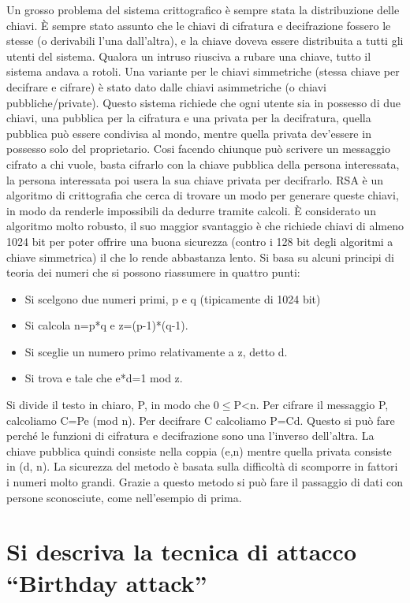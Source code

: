 Un grosso problema del sistema crittografico è sempre stata la distribuzione delle chiavi. 
È sempre stato assunto che le chiavi di cifratura e decifrazione fossero le stesse (o derivabili l’una dall’altra), e la chiave doveva essere distribuita a tutti gli utenti del sistema. Qualora un intruso riusciva a rubare una chiave, tutto il sistema andava a rotoli.
Una variante per le chiavi simmetriche (stessa chiave per decifrare e cifrare) è stato dato dalle chiavi asimmetriche (o chiavi pubbliche/private).
Questo sistema richiede che ogni utente sia in possesso di due chiavi, una pubblica per la cifratura e una privata per la decifratura, quella pubblica può essere condivisa al mondo, mentre quella privata dev’essere in possesso solo del proprietario.
Cosi facendo chiunque può scrivere un messaggio cifrato a chi vuole, basta cifrarlo con la chiave pubblica della persona interessata, la persona interessata poi usera la sua chiave privata per decifrarlo.
RSA è un algoritmo di crittografia che cerca di trovare un modo per generare queste chiavi, in modo da renderle impossibili da dedurre tramite calcoli.
È considerato un algoritmo molto robusto, il suo maggior svantaggio è che richiede chiavi di almeno 1024 bit per poter offrire una buona sicurezza (contro i 128 bit degli algoritmi a chiave simmetrica) il che lo rende abbastanza lento.
Si basa su alcuni principi di teoria dei numeri che si possono riassumere in quattro punti:
\begin{itemize}
\item	Si scelgono due numeri primi, p e q (tipicamente di 1024 bit)
\item	Si calcola n=p*q    e   z=(p-1)*(q-1).
\item	Si sceglie un numero primo relativamente a z, detto d.
\item	Si trova e tale che e*d=1 mod z.
\end{itemize}

Si divide il testo in chiaro, P, in modo che 0$\leq$P<n. Per cifrare il messaggio P, calcoliamo C=Pe (mod n). Per decifrare C calcoliamo P=Cd. Questo si può fare perché le funzioni di cifratura e decifrazione sono una l’inverso dell’altra.
La chiave pubblica quindi consiste nella coppia (e,n) mentre quella privata consiste in (d, n).
La sicurezza del metodo è basata sulla difficoltà di scomporre in fattori i numeri molto grandi.
Grazie a questo metodo si può fare il passaggio di dati con persone sconosciute, come nell’esempio di prima.
\section{Si descriva la tecnica di attacco “Birthday attack”}

